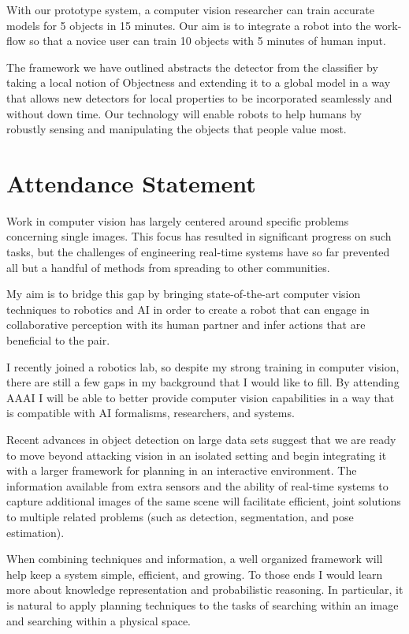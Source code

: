 \documentclass[12pt]{article}
\numberwithin{equation}{section}
\numberwithin{table}{section}
\numberwithin{figure}{section}
\begin{document}
With our prototype system, a computer vision researcher can train accurate models for 5
objects in 15 minutes. Our aim is to integrate a robot into the work-flow so that a novice
user can train 10 objects with 5 minutes of human input.

The framework we have outlined abstracts the detector from the classifier by taking a local notion 
of Objectness and extending it to a global model in a way that allows new detectors 
for local properties to be incorporated seamlessly and without down time.  Our technology 
will enable robots to help humans by robustly sensing and manipulating the objects that people value most.

\newpage




\newpage

\section{Attendance Statement}
Work in computer vision has largely centered around specific problems concerning
single images. This focus has resulted in significant progress on such tasks, but the challenges of 
engineering real-time systems have so far prevented all but a handful of methods from spreading 
to other communities.  

My aim is to bridge this gap by bringing state-of-the-art computer vision techniques to
robotics and AI in order to create a robot that can engage in collaborative perception with its
human partner and infer actions that are beneficial to the pair.

I recently joined a robotics lab, so despite my strong training in computer vision,
there are still a few gaps in my background that I would like to fill.
By attending AAAI I will be able to better provide computer vision capabilities in a
way that is compatible with AI formalisms, researchers, and systems.

Recent advances in object detection on large data sets suggest that we are ready
to move beyond attacking vision in an isolated setting and begin integrating it with a
larger framework for planning in an interactive environment. The information available from
extra sensors and the ability of real-time systems to capture additional images of the same scene
will facilitate efficient, joint solutions to multiple related problems (such as detection, segmentation, and pose estimation). 

When combining techniques and information, a well organized framework will help keep a system
simple, efficient, and growing. To those ends I would learn more about knowledge representation
and probabilistic reasoning. In particular, it is natural to apply planning techniques to
the tasks of searching within an image and searching within a physical space.
\end{document}
